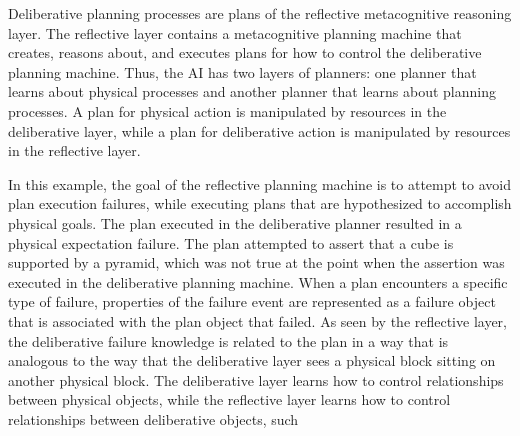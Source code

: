 Deliberative planning processes are plans of the reflective
metacognitive reasoning layer.  The reflective layer contains a
metacognitive planning machine that creates, reasons about, and
executes plans for how to control the deliberative planning machine.
Thus, the AI has two layers of planners: one planner that learns about
physical processes and another planner that learns about planning
processes.  A plan for physical action is manipulated by resources in
the deliberative layer, while a plan for deliberative action is
manipulated by resources in the reflective layer.

In this example, the goal of the reflective planning machine is to
attempt to avoid plan execution failures, while executing plans that
are hypothesized to accomplish physical goals.  The plan executed in
the deliberative planner resulted in a physical expectation failure.
The plan attempted to assert that a cube is supported by a pyramid,
which was not true at the point when the assertion was executed in the
deliberative planning machine.  When a plan encounters a specific type
of failure, properties of the failure event are represented as a
failure object that is associated with the plan object that failed.
As seen by the reflective layer, the deliberative failure knowledge is
related to the plan in a way that is analogous to the way that the
deliberative layer sees a physical block sitting on another physical
block.  The deliberative layer learns how to control relationships
between physical objects, while the reflective layer learns how to
control relationships between deliberative objects, such
